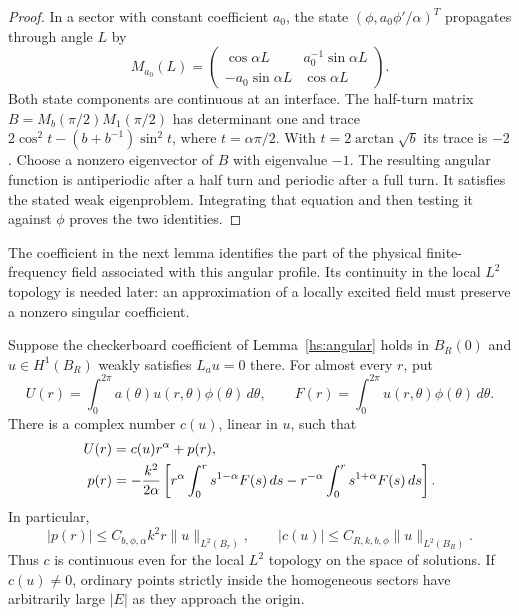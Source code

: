 \begin{proof}
In a sector with constant coefficient $a_0$, the state
$(\phi,a_0\phi'/\alpha)^T$ propagates through angle $L$ by
\begin{equation}
 M_{a_0}(L)=
 \begin{pmatrix}
 \cos\alpha L & a_0^{-1}\sin\alpha L\\
 -a_0\sin\alpha L & \cos\alpha L
 \end{pmatrix}.
 \label{hs:transfer}
\end{equation}
Both state components are continuous at an interface.  The half-turn
matrix $B=M_b(\pi/2)M_1(\pi/2)$ has determinant one and trace
$2\cos^2t-(b+b^{-1})\sin^2t$, where $t=\alpha\pi/2$.
With $t=2\arctan\sqrt b$ its trace is $-2$.  Choose a nonzero
eigenvector of $B$ with eigenvalue $-1$.  The resulting angular function
is antiperiodic after a half turn and periodic after a full turn.
It satisfies the stated weak eigenproblem.  Integrating that equation
and then testing it against $\phi$ proves the two identities.
\end{proof}

The coefficient in the next lemma identifies the part of the physical
finite-frequency field associated with this angular profile. Its continuity
in the local $L^2$ topology is needed later: an approximation of a locally
excited field must preserve a nonzero singular coefficient.

\begin{lemma}
\label{hs:coefficient}
Suppose the checkerboard coefficient of Lemma~\ref{hs:angular} holds in
$B_R(0)$ and $u\in H^1(B_R)$ weakly satisfies $L_au=0$ there.
For almost every $r$, put
\begin{equation}
 U(r)=\int_0^{2\pi}a(\theta)u(r,\theta)\phi(\theta)\,d\theta,
 \qquad F(r)=\int_0^{2\pi}u(r,\theta)\phi(\theta)\,d\theta.
 \label{hs:projections}
\end{equation}
There is a complex number $c(u)$, linear in $u$, such that
\begin{align}
 U(r)&=c(u)r^\alpha+p(r),\notag\\
 p(r)&=-\frac{k^2}{2\alpha}\left[
 r^\alpha\int_0^r s^{1-\alpha}F(s)\,ds
 -r^{-\alpha}\int_0^r s^{1+\alpha}F(s)\,ds\right].
 \label{hs:exact-projection}
\end{align}
In particular,
\begin{equation}
 |p(r)|\leq C_{b,\phi,\alpha}k^2r\|u\|_{L^2(B_r)},
 \qquad
 |c(u)|\leq C_{R,k,b,\phi}\|u\|_{L^2(B_R)}.
 \label{hs:projection-estimates}
\end{equation}
Thus $c$ is continuous even for the local $L^2$ topology on the
space of solutions.  If $c(u)\ne0$, ordinary points strictly inside the
homogeneous sectors have arbitrarily large $|E|$ as they approach the
origin.
\end{lemma}


